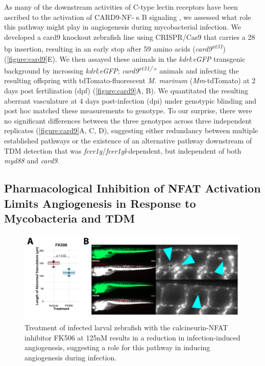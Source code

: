 As many of the downstream activities of C-type lectin receptors have been ascribed to the activation of CARD9-NF-$\upkappa$B signaling \citep{Goodridge2009, LobatoPascual2013, Zhao2014, Williams2017, Deerhake2021}, we assessed what role this pathway might play in angiogenesis during mycobacterial infection. We developed a card9 knockout zebrafish line using CRISPR/Cas9 that carries a 28 bp insertion, resulting in an early stop after 59 amino acids (\textit{card9\textsuperscript{xt31}}) (\autoref{figure:card9}E). We then assayed these animals in the \textit{kdrl}:\textit{eGFP} transgenic background by incrossing \textit{kdrl}:\textit{eGFP}; \textit{card9\textsuperscript{xt31/+}} animals and infecting the resulting offspring with tdTomato-fluorescent \textit{M. marinum} (\textit{Mm}-tdTomato) at 2 days post fertilization (dpf) \citep{Jin2005, Oehlers2015}(\autoref{figure:card9}A, B). We quantitated the resulting aberrant vasculature at 4 days post-infection (dpi) under genotypic blinding and post hoc matched these measurements to genotype. To our surprise, there were no significant differences between the three genotypes across three independent replicates (\autoref{figure:card9}A, C, D), suggesting either redundancy between multiple established pathways or the existence of an alternative pathway downstream of TDM detection that was \textit{fcer1g}/\textit{fcer1gl}-dependent, but independent of both \textit{myd88} and \textit{card9}. 

\subsection{Pharmacological Inhibition of NFAT Activation Limits Angiogenesis in Response to Mycobacteria and TDM}

\begin{figure}
\centering
\includegraphics[width=\textwidth]{images/fk506inf.pdf}
\caption{Treatment of infected larval zebrafish with the calcineurin-NFAT inhibitor FK506 at 125nM results in a reduction in infection-induced angiogenesis, suggesting a role for this pathway in inducing angiogenesis during infection.}
\label{figure:fk506inf}
\end{figure}

